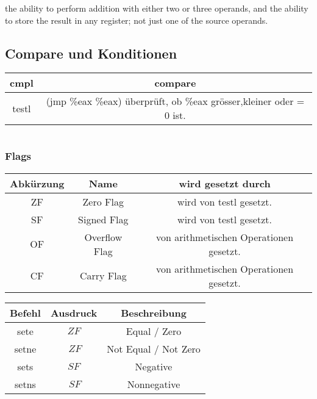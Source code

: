 \documentclass[a4paper, 11pt]{article}
\begin{document}
the ability to perform addition with either two or three operands, and
the ability to store the result in any register; not just one of the source operands.

\subsection{Compare und Konditionen}
\begin{tabular}{|c|c|}
	\hline
	cmpl & compare\\\hline
	testl & (jmp \%eax \%eax) überprüft, ob \%eax grösser,kleiner oder = 0 ist.\\\hline
\end{tabular}

\begin{tabular}{|c|c|}
	\hline
	

\end{tabular}

\subsubsection{Flags}
\begin{tabular}{|c|c|c|}
	\hline
	Abkürzung & Name & wird gesetzt durch \\\hline 
	ZF & Zero Flag & wird von testl gesetzt.\\\hline
	SF & Signed Flag & wird von testl gesetzt.\\\hline
	OF & Overflow Flag & von arithmetischen Operationen gesetzt.\\\hline
	CF & Carry Flag & von arithmetischen Operationen gesetzt.\\\hline
\end{tabular}

\begin{tabular}{|c|c|c|}
	\hline
	Befehl & Ausdruck & Beschreibung\\\hline 
	sete & $ZF$ & Equal / Zero\\\hline 
	setne & $~ZF$ & Not Equal / Not Zero\\\hline 
	sets & $SF$ & Negative\\\hline 
	setns & $~SF$ & Nonnegative\\\hline 
 
\end{tabular}
\end{document}
